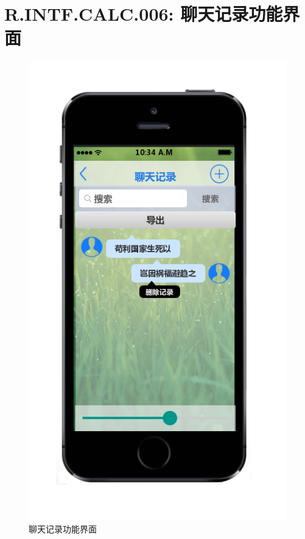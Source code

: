     \section{R.INTF.CALC.006: 聊天记录功能界面}
    \begin{figure}[h]
        \centering
        \includegraphics[scale=0.6]{OutlineDesign/figures/聊天记录功能界面.png}
        \caption{聊天记录功能界面}
        \label{fig:server_flow}
    \end{figure}
    \newpage

